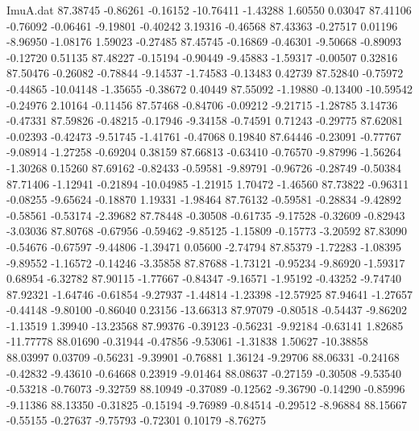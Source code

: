 \begin{filecontents}{ImuA.dat}
  87.38745   -0.86261   -0.16152  -10.76411   -1.43288    1.60550    0.03047
  87.41106   -0.76092   -0.06461   -9.19801   -0.40242    3.19316   -0.46568
  87.43363   -0.27517    0.01196   -8.96950   -1.08176    1.59023   -0.27485
  87.45745   -0.16869   -0.46301   -9.50668   -0.89093   -0.12720    0.51135
  87.48227   -0.15194   -0.90449   -9.45883   -1.59317   -0.00507    0.32816
  87.50476   -0.26082   -0.78844   -9.14537   -1.74583   -0.13483    0.42739
  87.52840   -0.75972   -0.44865  -10.04148   -1.35655   -0.38672    0.40449
  87.55092   -1.19880   -0.13400  -10.59542   -0.24976    2.10164   -0.11456
  87.57468   -0.84706   -0.09212   -9.21715   -1.28785    3.14736   -0.47331
  87.59826   -0.48215   -0.17946   -9.34158   -0.74591    0.71243   -0.29775
  87.62081   -0.02393   -0.42473   -9.51745   -1.41761   -0.47068    0.19840
  87.64446   -0.23091   -0.77767   -9.08914   -1.27258   -0.69204    0.38159
  87.66813   -0.63410   -0.76570   -9.87996   -1.56264   -1.30268    0.15260
  87.69162   -0.82433   -0.59581   -9.89791   -0.96726   -0.28749   -0.50384
  87.71406   -1.12941   -0.21894  -10.04985   -1.21915    1.70472   -1.46560
  87.73822   -0.96311   -0.08255   -9.65624   -0.18870    1.19331   -1.98464
  87.76132   -0.59581   -0.28834   -9.42892   -0.58561   -0.53174   -2.39682
  87.78448   -0.30508   -0.61735   -9.17528   -0.32609   -0.82943   -3.03036
  87.80768   -0.67956   -0.59462   -9.85125   -1.15809   -0.15773   -3.20592
  87.83090   -0.54676   -0.67597   -9.44806   -1.39471    0.05600   -2.74794
  87.85379   -1.72283   -1.08395   -9.89552   -1.16572   -0.14246   -3.35858
  87.87688   -1.73121   -0.95234   -9.86920   -1.59317    0.68954   -6.32782
  87.90115   -1.77667   -0.84347   -9.16571   -1.95192   -0.43252   -9.74740
  87.92321   -1.64746   -0.61854   -9.27937   -1.44814   -1.23398  -12.57925
  87.94641   -1.27657   -0.44148   -9.80100   -0.86040    0.23156  -13.66313
  87.97079   -0.80518   -0.54437   -9.86202   -1.13519    1.39940  -13.23568
  87.99376   -0.39123   -0.56231   -9.92184   -0.63141    1.82685  -11.77778
  88.01690   -0.31944   -0.47856   -9.53061   -1.31838    1.50627  -10.38858
  88.03997    0.03709   -0.56231   -9.39901   -0.76881    1.36124   -9.29706
  88.06331   -0.24168   -0.42832   -9.43610   -0.64668    0.23919   -9.01464
  88.08637   -0.27159   -0.30508   -9.53540   -0.53218   -0.76073   -9.32759
  88.10949   -0.37089   -0.12562   -9.36790   -0.14290   -0.85996   -9.11386
  88.13350   -0.31825   -0.15194   -9.76989   -0.84514   -0.29512   -8.96884
  88.15667   -0.55155   -0.27637   -9.75793   -0.72301    0.10179   -8.76275

\end{filecontents}
